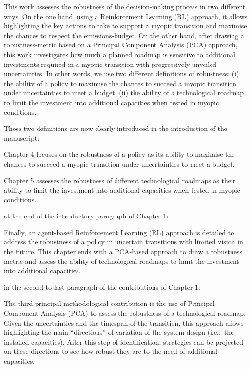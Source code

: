 \documentclass[12pt,a4paper]{article}
\def\ie{i.e.,\ }
\begin{document}
\noindent This work assesses the robustness of the decision-making process in two different ways. On the one hand, using a Reinforcement Learning (RL) approach, it allows highlighting the key actions to take to support a myopic transition and maximise the chances to respect the emissions-budget. On the other hand, after drawing a robustness-metric based on a Principal Component Analysis (PCA) approach, this work investigates how much a planned roadmap is sensitive to additional investments required in a myopic transition with progressively unveiled uncertainties. In other words, we use two different definitions of robustness: (i) the ability of a policy to maximise the chances to succeed a myopic transition under uncertainties to meet a  budget, (ii) the ability of a technological roadmap to limit the investment into additional capacities when tested in myopic conditions. 

These two definitions are now clearly introduced {\color{blue}in the introduction of the manuscript}:

\begin{mdframed}[style=manuscript] %
Chapter 4 focuses on the robustness of a policy as its ability to maximise the chances to succeed a myopic transition under uncertainties to meet a  budget.

Chapter 5 assesses the robustness of different technological roadmaps as their ability to limit the investment into additional capacities when tested in myopic conditions. 
\end{mdframed}

{\color{blue}at the end of the introductory paragraph of Chapter 1}:

\begin{mdframed}[style=manuscript] %
Finally, an agent-based Reinforcement Learning (RL) approach is detailed to address the robustness of a policy in uncertain transitions with limited vision in the future. This chapter ends with a PCA-based approach to draw a robustness metric and assess the ability of technological roadmaps to limit the investment into additional capacities.
\end{mdframed}

{\color{blue}in the second to last paragraph of the contributions of Chapter 1}:

\begin{mdframed}[style=manuscript] %
The third principal methodological contribution is the use of Principal Component Analysis (PCA) to assess the robustness of a technological roadmap. Given the uncertainties and the timespan of the transition, this approach allows highlighting the main ``directions'' of variation of the system design (\ie the installed capacities). After this step of identification, strategies can be projected on these directions to see how robust they are to the need of additional capacities.
\end{mdframed}
\end{document}
